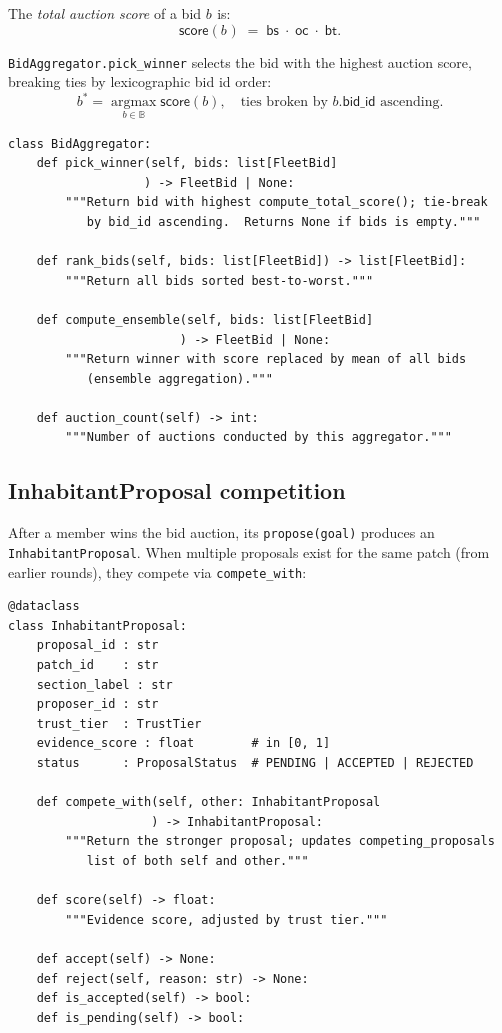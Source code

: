 \documentclass[11pt]{article}
\providecommand{\BidSet}{\mathbb{B}}               %
\providecommand{\bid}[1]{b_{#1}}                   %
\providecommand{\score}{\mathsf{score}}            %
\providecommand{\argmax}{\operatorname*{argmax}}    %
\providecommand{\AggPY}{\texttt{BidAggregator}}
\providecommand{\ProposalPY}{\texttt{InhabitantProposal}}
\begin{document}
\begin{definition}
The \emph{total auction score} of a bid $\bid{}$ is:
\[
  \score(\bid{})
  \;=\;
  \mathsf{bs} \;\cdot\; \mathsf{oc} \;\cdot\; \mathsf{bt}.
\]
\end{definition}

\AggPY{}\texttt{.pick\_winner} selects the bid with the highest auction
score, breaking ties by lexicographic bid id order:
\[
  b^* = \argmax_{b \in \BidSet} \score(b),
  \quad \text{ties broken by } b.\mathsf{bid\_id} \text{ ascending.}
\]

\begin{lstlisting}[style=jugeo-python, caption={\AggPY{} interface.}]
class BidAggregator:
    def pick_winner(self, bids: list[FleetBid]
                   ) -> FleetBid | None:
        """Return bid with highest compute_total_score(); tie-break
           by bid_id ascending.  Returns None if bids is empty."""

    def rank_bids(self, bids: list[FleetBid]) -> list[FleetBid]:
        """Return all bids sorted best-to-worst."""

    def compute_ensemble(self, bids: list[FleetBid]
                        ) -> FleetBid | None:
        """Return winner with score replaced by mean of all bids
           (ensemble aggregation)."""

    def auction_count(self) -> int:
        """Number of auctions conducted by this aggregator."""
\end{lstlisting}

\subsection{InhabitantProposal competition}

After a member wins the bid auction, its \texttt{propose(goal)} produces an
\ProposalPY{}.  When multiple proposals exist for the same patch (from
earlier rounds), they compete via \texttt{compete\_with}:

\begin{lstlisting}[style=jugeo-python, caption={\ProposalPY{} competition interface.}]
@dataclass
class InhabitantProposal:
    proposal_id : str
    patch_id    : str
    section_label : str
    proposer_id : str
    trust_tier  : TrustTier
    evidence_score : float        # in [0, 1]
    status      : ProposalStatus  # PENDING | ACCEPTED | REJECTED

    def compete_with(self, other: InhabitantProposal
                    ) -> InhabitantProposal:
        """Return the stronger proposal; updates competing_proposals
           list of both self and other."""

    def score(self) -> float:
        """Evidence score, adjusted by trust tier."""

    def accept(self) -> None:
    def reject(self, reason: str) -> None:
    def is_accepted(self) -> bool:
    def is_pending(self) -> bool:
\end{lstlisting}
\end{document}
